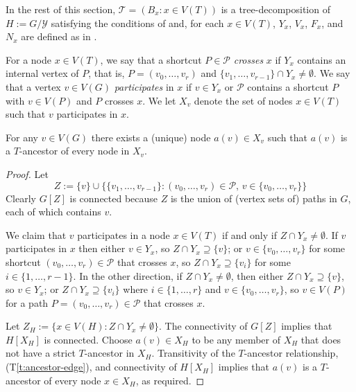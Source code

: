 \documentclass{patmorin}
\newcommand{\tref}[1]{(T\ref{t:#1})}
\begin{document}
In the rest of this section, 
$\mathcal{T}=(B_x:x\in V(T))$ is a tree-decomposition of $H:=G/\mathcal{Y}$ satisfying the conditions of  and, for each $x\in V(T)$, $Y_x$, $V_x$, $F_x$, and $N_x$ are defined as in .

For a node $x\in V(T)$, we say that a shortcut $P\in\mathcal{P}$ \emph{crosses} $x$ if $Y_x$ contains an internal vertex of $P$, that is, $P=(v_0,\ldots,v_r)$ and $\{v_1,\ldots,v_{r-1}\}\cap Y_x\neq\emptyset$.  We say that a vertex $v\in V(G)$ \emph{participates} in $x$ if $v\in Y_x$ or $\mathcal{P}$ contains a shortcut $P$ with $v\in V(P)$ and $P$ crosses $x$. We let $X_v$ denote the set of nodes $x\in V(T)$ such that $v$ participates in $x$.

\begin{clm}
  For any $v\in V(G)$ there exists a (unique) node $a(v)\in X_v$ such that
  $a(v)$ is a $T$-ancestor of every node in $X_v$.
\end{clm}

\begin{proof}
  Let 
  \[
     Z := \{v\} \cup \{\{v_1,\ldots,v_{r-1}\}:\mbox{$(v_0,\ldots,v_r)\in\mathcal{P}$, $v\in \{v_0,\ldots,v_r\}$}\}
  \]
  Clearly $G[Z]$ is connected because $Z$ is the union of (vertex sets of) paths in $G$, each of which contains $v$. 
  
  We claim that $v$ participates in a node $x\in V(T)$ if and only if $Z\cap Y_x\neq\emptyset$.  If $v$ participates in $x$ then either $v\in Y_x$, so $Z\cap Y_x\supseteq\{v\}$; or $v\in \{v_0,\ldots,v_r\}$ for some shortcut $(v_0,\ldots,v_r)\in\mathcal{P}$ that crosses $x$, so $Z\cap Y_x\supseteq \{v_i\}$ for some $i\in\{1,\ldots,r-1\}$.  In the other direction, if $Z\cap Y_x\neq\emptyset$, then either $Z\cap Y_x\supseteq \{v\}$, so $v\in Y_x$; or $Z\cap Y_x\supseteq \{v_i\}$ where $i\in\{1,\ldots,r\}$ and $v\in\{v_0,\ldots,v_r\}$, so $v\in V(P)$ for a path $P=(v_0,\ldots,v_r)\in\mathcal{P}$ that crosses $x$. 

  Let $Z_H:=\{x\in V(H): Z\cap Y_x\neq\emptyset\}$.  The connectivity of $G[Z]$ implies that $H[X_H]$ is connected.  
  Choose $a(v)\in X_H$ to be any member of $X_H$ that does not have a strict $T$-ancestor in $X_H$.  Transitivity of the $T$-ancestor relationship, \tref{ancestor-edge}, and connectivity of $H[X_H]$ implies that $a(v)$ is a $T$-ancestor of every node $x\in X_H$, as required.
\end{proof}
\end{document}

